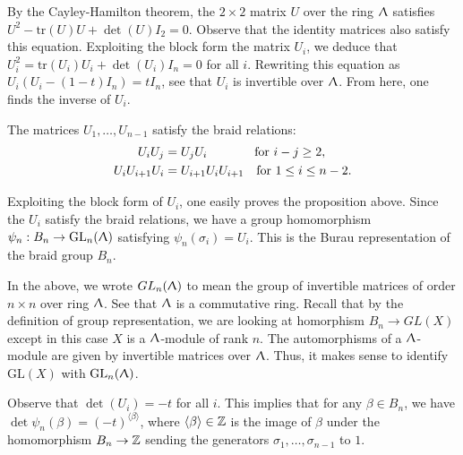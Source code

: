 By the Cayley-Hamilton theorem, the $2 \times 2$ matrix $U$ over the ring $\Uplambda$ satisfies $U^2 - \text{tr}(U)U + \det(U)I_2 = 0$. Observe that the identity matrices also satisfy this equation. Exploiting the block form the matrix $U_i$, we deduce that $U_i^2 = \text{tr}(U_i)U_i + \det(U_i)I_n = 0$ for all $i$. Rewriting this equation as $U_i(U_i - (1-t)I_n) = tI_n$, see that $U_i$ is invertible over $\Uplambda$. From here, one finds the inverse of $U_i$.

\begin{proposition}
\label{sec:burau-representation-2}
The matrices $U_1, \ldots, U_{n-1}$ satisfy the braid relations:
\begin{align}
\label{eq:10}
  U_iU_j &= U_jU_i \hspace*{3.8em}\text{for } i-j \geq 2, \\
  U_iU_{i+1}U_i &= U_{i+1}U_iU_{i+1} \hspace*{1em}\text{for } 1 \leq i \leq n-2.
\end{align}
\end{proposition}

Exploiting the block form of $U_i$, one easily proves the proposition above. Since the $U_i$ satisfy the braid relations, we have a group homomorphism $\psi_n: B_n \to \text{GL}_n(\Uplambda)$ satisfying $\psi_n(\sigma_i) = U_i$. This is the Burau representation of the braid group $B_n$.

\begin{remark}
\label{sec:burau-representation-5}
  In the above, we wrote $GL_n(\Uplambda)$ to mean the group of invertible matrices of order $n\times n$ over ring $\Uplambda$. See that $\Uplambda$ is a commutative ring. Recall that by the definition of group representation, we are looking at homorphism $B_n \to GL(X)$ except in this case $X$ is a $\Uplambda$-module of rank $n$. The automorphisms of a $\Uplambda$-module are given by invertible matrices over $\Uplambda$. Thus, it makes sense to identify $\text{GL}(X)$ with $\text{GL}_n(\Uplambda)$.
\end{remark}

\begin{remark}
\label{sec:burau-representation-6}
Observe that $\det(U_i) = -t$ for all $i$. This implies that for any $\beta \in B_n$, we have $\det \psi_n(\beta) = (-t)^{\langle \beta \rangle}$, where $\langle \beta \rangle \in \mathbb{Z}$ is the image of $\beta$ under the homomorphism $B_n \to \mathbb{Z}$ sending the generators $\sigma_1, \ldots, \sigma_{n-1}$ to $1$.
\end{remark}

